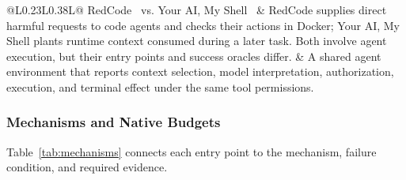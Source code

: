 \documentclass[acmsmall,screen,review,nonacm]{acmart}
\begin{document}
\begin{longtable}{@{}L{0.23\textwidth}L{0.38\textwidth}L{\tabcolsep\relax}@{}}
RedCode~\cite{redcode2024} vs. Your AI, My Shell~\cite{liu2025yourai} & RedCode supplies direct harmful requests to code agents and checks their actions in Docker; Your AI, My Shell plants runtime context consumed during a later task. Both involve agent execution, but their entry points and success oracles differ. & A shared agent environment that reports context selection, model interpretation, authorization, execution, and terminal effect under the same tool permissions. \\
\end{longtable}



\subsubsection{Mechanisms and Native Budgets}
Table~\ref{tab:mechanisms} connects each entry point to the mechanism, failure condition, and required evidence.
\end{document}
